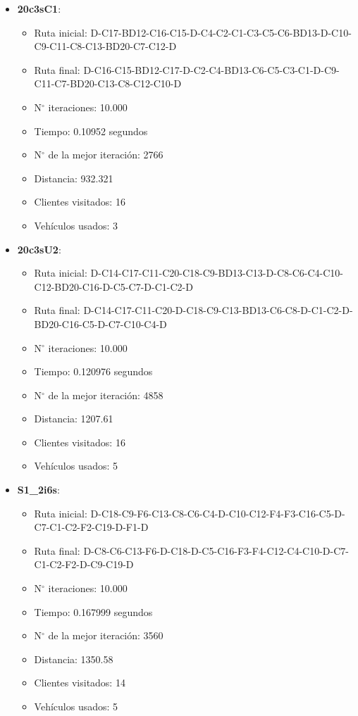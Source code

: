 \documentclass[letter, 10pt]{article}
\begin{document}
\begin{itemize}
\item \textbf{20c3sC1}:

	\begin{itemize}
	\item Ruta inicial: D-C17-BD12-C16-C15-D-C4-C2-C1-C3-C5-C6-BD13-D-C10-C9-C11-C8-C13-BD20-C7-C12-D
	\item Ruta final: D-C16-C15-BD12-C17-D-C2-C4-BD13-C6-C5-C3-C1-D-C9-C11-C7-BD20-C13-C8-C12-C10-D
	\item N\(^\circ\) iteraciones: 10.000
	\item Tiempo: 0.10952 segundos
	\item N\(^\circ\) de la mejor iteración: 2766
	\item Distancia: 932.321
	\item Clientes visitados: 16
	\item Vehículos usados: 3
	\end{itemize}

\item \textbf{20c3sU2}:

	\begin{itemize}
	\item Ruta inicial: D-C14-C17-C11-C20-C18-C9-BD13-C13-D-C8-C6-C4-C10-C12-BD20-C16-D-C5-C7-D-C1-C2-D
	\item Ruta final: D-C14-C17-C11-C20-D-C18-C9-C13-BD13-C6-C8-D-C1-C2-D-BD20-C16-C5-D-C7-C10-C4-D
	\item N\(^\circ\) iteraciones: 10.000
	\item Tiempo: 0.120976 segundos
	\item N\(^\circ\) de la mejor iteración: 4858
	\item Distancia: 1207.61
	\item Clientes visitados: 16
	\item Vehículos usados: 5
	\end{itemize}
	
\item \textbf{S1\_2i6s}:

	\begin{itemize}
	\item Ruta inicial: D-C18-C9-F6-C13-C8-C6-C4-D-C10-C12-F4-F3-C16-C5-D-C7-C1-C2-F2-C19-D-F1-D
	\item Ruta final: D-C8-C6-C13-F6-D-C18-D-C5-C16-F3-F4-C12-C4-C10-D-C7-C1-C2-F2-D-C9-C19-D
	\item N\(^\circ\) iteraciones: 10.000
	\item Tiempo: 0.167999 segundos
	\item N\(^\circ\) de la mejor iteración: 3560
	\item Distancia: 1350.58
	\item Clientes visitados: 14
	\item Vehículos usados: 5
	\end{itemize}
	

\end{itemize}
\end{document}

